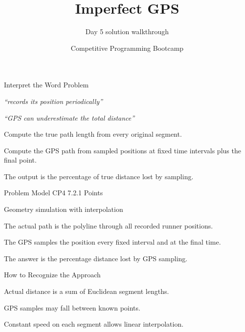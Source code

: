 \documentclass[aspectratio=169,11pt]{beamer}
\title[imperfectgps]{Imperfect GPS}
\subtitle{Day 5 solution walkthrough}
\author[Solution Deck]{Competitive Programming Bootcamp}
\date{}
\begin{document}
\begin{frame}[plain]
  \titlepage
\end{frame}

\begin{frame}{Interpret the Word Problem}
\small
{}
\begin{tightitemize}
  \item \textit{``records its position periodically''}
  \item \textit{``GPS can underestimate the total distance''}
\end{tightitemize}

\vspace{0.18cm}
\begin{tightitemize}
  \item Compute the true path length from every original segment.
  \item Compute the GPS path from sampled positions at fixed time intervals plus the final point.
  \item The output is the percentage of true distance lost by sampling.
\end{tightitemize}
\end{frame}







\begin{frame}{Problem Model}
\small
{} CP4 7.2.1 Points

\vspace{0.25cm}
 Geometry simulation with interpolation

\vspace{0.25cm}
\begin{tightitemize}
  \item The actual path is the polyline through all recorded runner positions.
  \item The GPS samples the position every fixed interval and at the final time.
  \item The answer is the percentage distance lost by GPS sampling.
\end{tightitemize}
\end{frame}

\begin{frame}{How to Recognize the Approach}
\begin{tightitemize}
  \item Actual distance is a sum of Euclidean segment lengths.
  \item GPS samples may fall between known points.
  \item Constant speed on each segment allows linear interpolation.
\end{tightitemize}
\end{frame}
\end{document}
